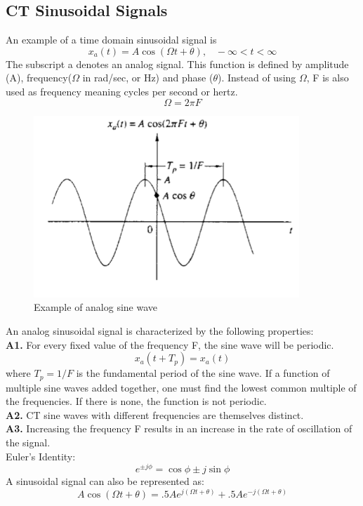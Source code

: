 \documentclass{article} %
\begin{document}
    \subsection{CT Sinusoidal Signals}
    An example of a time domain sinusoidal signal is
    \begin{equation}  
	x_a(t) = A\cos(\Omega t + \theta), \;\;\;-\infty < t < \infty     
    \end{equation}
    The subscript a denotes an analog signal. This function is defined by amplitude (A), frequency($\Omega$ in rad/sec, or Hz) and phase ($\theta$). Instead of using $\Omega$, F is also used
    as frequency meaning cycles per second or hertz.
    \begin{equation}  
	\Omega = 2 \pi F    
    \end{equation}
    
    \begin{figure}[h]
    \centering
	\includegraphics[width=10cm]{ct_sin}
	\caption{Example of analog sine wave}
	\end{figure}
	An analog sinusoidal signal is characterized by the following properties:\\
	\textbf{A1.} For every fixed value of the frequency F, the sine wave will be periodic.
	\begin{equation}  
	x_a(t + T_p) = x_a(t)  
    \end{equation}
    where $T_p = 1/F$ is the fundamental period of the sine wave. If a function of multiple sine waves added together, one must find the lowest common multiple of the frequencies. If there is none, the function is not periodic.\\
    \textbf{A2.} CT sine waves with different frequencies are themselves distinct. \\
    \textbf{A3.} Increasing the frequency F results in an increase in the rate of oscillation of the signal.\\
    Euler's Identity:
    \begin{equation}  
	e^{\pm j\phi} = \cos\phi \pm j\sin\phi
    \end{equation}
    A sinusoidal signal can also be represented as:
    \begin{equation}
	A\cos (\Omega t + \theta) = .5A e^{j(\Omega t + \theta)} + .5Ae^{-j(\Omega t + \theta)}
    \end{equation}
    
\end{document}
